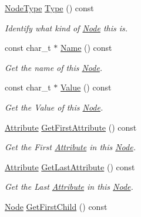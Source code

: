 \begin{DoxyCompactItemize}
\hyperlink{namespacephys_1_1xml_a668b0cc666a9d49f7c7222a7552115d3}{NodeType} \hyperlink{classphys_1_1xml_1_1Node_a33288f89218baf24d1061c6eeb08687f}{Type} () const 
\begin{DoxyCompactList}\small\item\em Identify what kind of \hyperlink{classphys_1_1xml_1_1Node}{Node} this is. \item\end{DoxyCompactList}\item 
const char\_\-t $\ast$ \hyperlink{classphys_1_1xml_1_1Node_a53facd97d76240a3f3fffc86caacdc24}{Name} () const 
\begin{DoxyCompactList}\small\item\em Get the name of this \hyperlink{classphys_1_1xml_1_1Node}{Node}. \item\end{DoxyCompactList}\item 
const char\_\-t $\ast$ \hyperlink{classphys_1_1xml_1_1Node_a90e8efb31007ade54d62c1752979461f}{Value} () const 
\begin{DoxyCompactList}\small\item\em Get the Value of this \hyperlink{classphys_1_1xml_1_1Node}{Node}. \item\end{DoxyCompactList}\item 
\hyperlink{classphys_1_1xml_1_1Attribute}{Attribute} \hyperlink{classphys_1_1xml_1_1Node_ae484caac4f1fb2a4b7767ddfed28bf0c}{GetFirstAttribute} () const 
\begin{DoxyCompactList}\small\item\em Get the First \hyperlink{classphys_1_1xml_1_1Attribute}{Attribute} in this \hyperlink{classphys_1_1xml_1_1Node}{Node}. \item\end{DoxyCompactList}\item 
\hyperlink{classphys_1_1xml_1_1Attribute}{Attribute} \hyperlink{classphys_1_1xml_1_1Node_a9c5ff28c5d1a04ca38da1d7df118ed5f}{GetLastAttribute} () const 
\begin{DoxyCompactList}\small\item\em Get the Last \hyperlink{classphys_1_1xml_1_1Attribute}{Attribute} in this \hyperlink{classphys_1_1xml_1_1Node}{Node}. \item\end{DoxyCompactList}\item 
\hyperlink{classphys_1_1xml_1_1Node}{Node} \hyperlink{classphys_1_1xml_1_1Node_a70a568eff666114c28cba812ff202cb6}{GetFirstChild} () const 

\end{DoxyCompactItemize}
